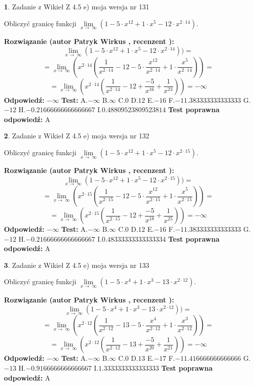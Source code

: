 \documentclass[12pt, a4paper]{article}
\theoremstyle{definition} %
\newtheorem{zad}{}
\newcommand{\zadStart}[1]{\begin{zad}#1\newline}
\newcommand{\zadStop}{\end{zad}}
\newcommand{\rozwStart}[2]{\noindent \textbf{Rozwiązanie (autor #1 , recenzent #2): }\newline}
\newcommand{\rozwStop}{\newline}
\newcommand{\odpStart}{\noindent \textbf{Odpowiedź:}\newline}
\newcommand{\odpStop}{\newline}
\newcommand{\testStart}{\noindent \textbf{Test:}\newline}
\newcommand{\testStop}{\newline}
\newcommand{\kluczStart}{\noindent \textbf{Test poprawna odpowiedź:}\newline}
\newcommand{\kluczStop}{\newline}
\begin{document}
\zadStart{Zadanie z Wikieł Z 4.5 e) moja wersja nr 131}


Obliczyć granicę funkcji  $\lim\limits_{x\to\ \infty}(1 - 5 \cdot x^{12}+1 \cdot x^{5}- 12 \cdot x^{2\cdot14})$.
\zadStop
\rozwStart{Patryk Wirkus}{}
$$\lim\limits_{x\to\ \infty}(1 - 5 \cdot x^{12}+1 \cdot x^{5}- 12 \cdot x^{2\cdot14}))=$$
$$=\lim\limits_{x\to\ \infty}(x^{2\cdot14}(\frac{1}{x^{2\cdot14}}-12 -5 \cdot \frac{x^{12}}{x^{2\cdot14}}+1 \cdot \frac{x^{5}}{x^{2\cdot14}}))=$$
$$=\lim\limits_{x\to\ \infty}(x^{2\cdot14}(\frac{1}{x^{2\cdot14}}-12 + \frac{-5}{x^{16}}+ \frac{1}{x^{23}}))=-\infty$$
\rozwStop
\odpStart
$-\infty$
\odpStop
\testStart
A.$-\infty$ B.$\infty$ C.$0$ D.$12$ E.$-16$
F.$-11.383333333333333$ G.$-12$
H.$-0.21666666666666667$
I.$0.48809523809523814$
\testStop
\kluczStart
A
\kluczStop



\zadStart{Zadanie z Wikieł Z 4.5 e) moja wersja nr 132}


Obliczyć granicę funkcji  $\lim\limits_{x\to\ \infty}(1 - 5 \cdot x^{12}+1 \cdot x^{5}- 12 \cdot x^{2\cdot15})$.
\zadStop
\rozwStart{Patryk Wirkus}{}
$$\lim\limits_{x\to\ \infty}(1 - 5 \cdot x^{12}+1 \cdot x^{5}- 12 \cdot x^{2\cdot15}))=$$
$$=\lim\limits_{x\to\ \infty}(x^{2\cdot15}(\frac{1}{x^{2\cdot15}}-12 -5 \cdot \frac{x^{12}}{x^{2\cdot15}}+1 \cdot \frac{x^{5}}{x^{2\cdot15}}))=$$
$$=\lim\limits_{x\to\ \infty}(x^{2\cdot15}(\frac{1}{x^{2\cdot15}}-12 + \frac{-5}{x^{18}}+ \frac{1}{x^{25}}))=-\infty$$
\rozwStop
\odpStart
$-\infty$
\odpStop
\testStart
A.$-\infty$ B.$\infty$ C.$0$ D.$12$ E.$-16$
F.$-11.383333333333333$ G.$-12$
H.$-0.21666666666666667$
I.$0.48333333333333334$
\testStop
\kluczStart
A
\kluczStop



\zadStart{Zadanie z Wikieł Z 4.5 e) moja wersja nr 133}


Obliczyć granicę funkcji  $\lim\limits_{x\to\ \infty}(1 - 5 \cdot x^{4}+1 \cdot x^{3}- 13 \cdot x^{2\cdot12})$.
\zadStop
\rozwStart{Patryk Wirkus}{}
$$\lim\limits_{x\to\ \infty}(1 - 5 \cdot x^{4}+1 \cdot x^{3}- 13 \cdot x^{2\cdot12}))=$$
$$=\lim\limits_{x\to\ \infty}(x^{2\cdot12}(\frac{1}{x^{2\cdot12}}-13 -5 \cdot \frac{x^{4}}{x^{2\cdot12}}+1 \cdot \frac{x^{3}}{x^{2\cdot12}}))=$$
$$=\lim\limits_{x\to\ \infty}(x^{2\cdot12}(\frac{1}{x^{2\cdot12}}-13 + \frac{-5}{x^{20}}+ \frac{1}{x^{21}}))=-\infty$$
\rozwStop
\odpStart
$-\infty$
\odpStop
\testStart
A.$-\infty$ B.$\infty$ C.$0$ D.$13$ E.$-17$
F.$-11.416666666666666$ G.$-13$
H.$-0.9166666666666667$
I.$1.3333333333333333$
\testStop
\kluczStart
A
\kluczStop
\end{document}
